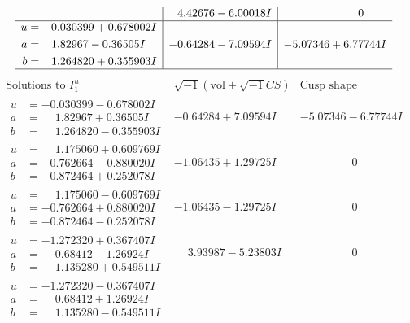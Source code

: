 \documentclass[1p]{elsarticle_modified}
\theoremstyle{definition}
\newcommand{\I}{\sqrt{-1}}
\begin{document}
$$\begin{array}{c|c|c}
 & \phantom{-}4.42676 - 6.00018 I & \phantom{-0.000000 } 0 \\ \hline\begin{aligned}
u &= -0.030399 + 0.678002 I \\
a &= \phantom{-}1.82967 - 0.36505 I \\
b &= \phantom{-}1.264820 + 0.355903 I\end{aligned}
 & -0.64284 - 7.09594 I & -5.07346 + 6.77744 I\\
 \hline 
 \end{array}$$\newpage$$\begin{array}{c|c|c}  
\text{Solutions to }I^u_{1}& \I (\text{vol} + \sqrt{-1}CS) & \text{Cusp shape}\\
 \hline 
\begin{aligned}
u &= -0.030399 - 0.678002 I \\
a &= \phantom{-}1.82967 + 0.36505 I \\
b &= \phantom{-}1.264820 - 0.355903 I\end{aligned}
 & -0.64284 + 7.09594 I & -5.07346 - 6.77744 I \\ \hline\begin{aligned}
u &= \phantom{-}1.175060 + 0.609769 I \\
a &= -0.762664 - 0.880020 I \\
b &= -0.872464 + 0.252078 I\end{aligned}
 & -1.06435 + 1.29725 I & \phantom{-0.000000 } 0 \\ \hline\begin{aligned}
u &= \phantom{-}1.175060 - 0.609769 I \\
a &= -0.762664 + 0.880020 I \\
b &= -0.872464 - 0.252078 I\end{aligned}
 & -1.06435 - 1.29725 I & \phantom{-0.000000 } 0 \\ \hline\begin{aligned}
u &= -1.272320 + 0.367407 I \\
a &= \phantom{-}0.68412 - 1.26924 I \\
b &= \phantom{-}1.135280 + 0.549511 I\end{aligned}
 & \phantom{-}3.93987 - 5.23803 I & \phantom{-0.000000 } 0 \\ \hline\begin{aligned}
u &= -1.272320 - 0.367407 I \\
a &= \phantom{-}0.68412 + 1.26924 I \\
b &= \phantom{-}1.135280 - 0.549511 I\end{aligned}

\end{array}$$
\end{document}
